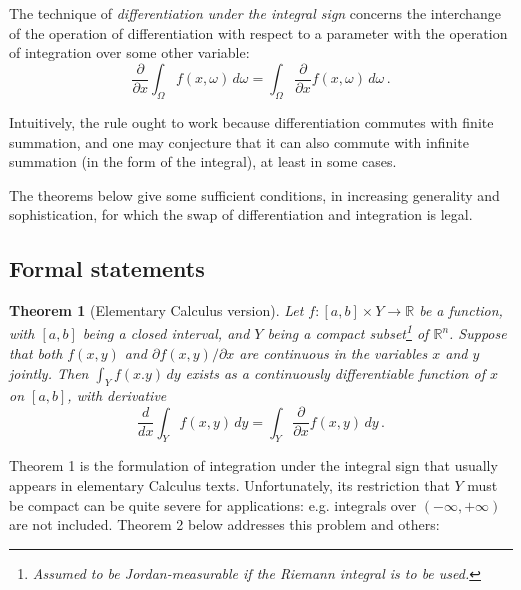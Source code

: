 \documentclass[12pt]{article}
\newcommand{\real}{\mathbb{R}}
\providecommand{\ddx}[1]{\frac{d #1}{dx}}
\providecommand{\pdx}[1]{\frac{\partial #1}{\partial x}}
\providecommand{\ipdx}[1]{\partial #1 / \partial x}
\newtheorem{thm}{Theorem}
\begin{document}

The technique of \emph{differentiation under the integral sign}
concerns the interchange of the operation of differentiation
with respect to a parameter with the operation of integration
over some other variable:
\[
\pdx{} \int_\Omega f(x, \omega) \, d\omega = \int_\Omega 
\pdx{} f(x,\omega) \, d\omega\,.
\]

Intuitively, the rule ought to work because 
differentiation commutes with finite summation,
and one may conjecture that it can also 
commute with infinite summation (in the form of the integral),
at least in some cases.

The theorems below give some sufficient conditions,
in increasing generality and sophistication,
for which the swap of differentiation and
integration is legal.

\subsection*{Formal statements}

\begin{thm}[Elementary Calculus version]\label{thm:elem}
Let $f\colon [a,b] \times Y \to \real$ be a function,
with $[a,b]$ being a closed interval, and
$Y$ being a compact subset\footnote{Assumed to be Jordan-measurable if the Riemann integral is to be used.} of $\real^n$.
Suppose that both $f(x,y)$ and $\ipdx{f(x,y)}$ are continuous 
in the variables $x$ and $y$ jointly.
Then $\int_Y f(x.y) \, dy$ exists as a continuously differentiable function of
$x$ on $[a,b]$, with derivative
\[
\ddx{} \int_Y f(x, y) \, dy = \int_Y \pdx{} f(x,y) \, dy\,.
\]
\end{thm}

Theorem 1 is the formulation of integration
under the integral sign that usually appears in elementary Calculus texts.
Unfortunately, its restriction that $Y$ must
be compact can be quite severe for applications: e.g.
integrals over $(-\infty,+\infty)$ are not included.
Theorem 2 below addresses this problem and others:
\end{document}
